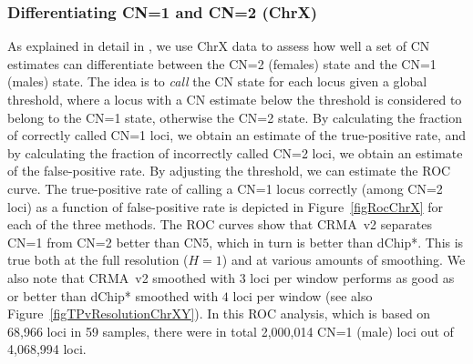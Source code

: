 \documentclass{bioinfo}
\newcommand{\TPrate}{true-positive rate\xspace}
\newcommand{\FPrate}{false-positive rate\xspace}
\begin{document}
\subsubsection{Differentiating CN=1 and CN=2 (ChrX)}
As explained in detail in \citet{BengtssonH_etal_2008}, we use ChrX data to assess how well a set of CN estimates can differentiate between the CN=2 (females) state and the CN=1 (males) state.  The idea is to \emph{call} the CN state for each locus given a global threshold, where a locus with a CN estimate below the threshold is considered to belong to the CN=1 state, otherwise the CN=2 state. By calculating the fraction of correctly called CN=1 loci, we obtain an estimate of the \TPrate, and by calculating the fraction of incorrectly called CN=2 loci, we obtain an estimate of the \FPrate.  By adjusting the threshold, we can estimate the ROC curve.
The \TPrate of calling a CN=1 locus correctly (among CN=2 loci) as a function of \FPrate is depicted in Figure~\ref{figRocChrX} for each of the three methods.
The ROC curves show that CRMA~v2 separates CN=1 from CN=2 better than CN5, which in turn is better than dChip*.  This is true both at the full resolution ($H=1$) and at various amounts of smoothing.  
We also note that CRMA~v2 smoothed with $3$ loci per window performs as good as or better than dChip* smoothed with $4$ loci per window (see also Figure~\ref{figTPvResolutionChrXY}).
In this ROC analysis, which is based on 68,966 loci in 59 samples, there were in total 2,000,014 CN=1 (male) loci out of 4,068,994 loci.
\end{document}
